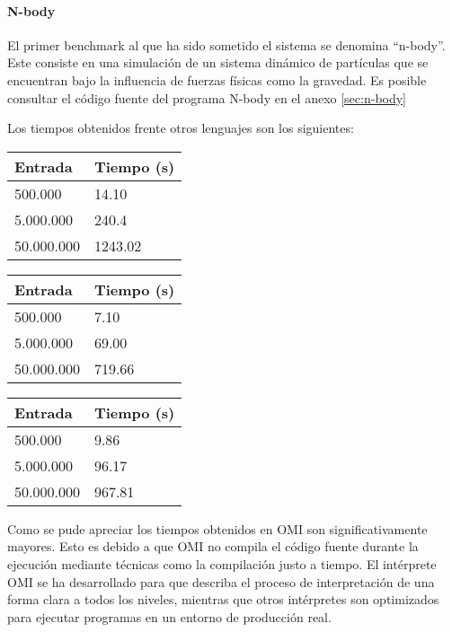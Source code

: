 \paragraph{N-body}

El primer benchmark al que ha sido sometido el sistema se denomina ``n-body''. Este consiste en una simulación de un sistema dinámico de
partículas que se encuentran bajo la influencia de fuerzas físicas como la gravedad. Es posible consultar el código fuente del programa N-body en el anexo \ref{sec:n-body}

Los tiempos obtenidos frente otros lenguajes son los siguientes: 

\begin{multicols}{2}
 \begin{center}
   \begin{tabular}{|l|l|} \hline 
   \bf{Entrada} & \bf{Tiempo (s)} \\ \hline 
   500.000 & 14.10 \\ \hline 
   5.000.000 &  240.4 \\ \hline
   50.000.000 & 1243.02 \\ \hline 
   \end{tabular}
   \end{center}
\columnbreak
   \begin{center}
   \begin{tabular}{|l|l|} \hline 
   \bf{Entrada} & \bf{Tiempo (s)} \\ \hline 
   500.000 & 7.10 \\ \hline 
   5.000.000 & 69.00	 \\ \hline
   50.000.000 & 719.66 \\ \hline 
   \end{tabular}
   \end{center}
\end{multicols}
 \begin{center}
\begin{tabular}{|l|l|} \hline 
\bf{Entrada} & \bf{Tiempo (s)} \\ \hline 
500.000 & 9.86	 \\ \hline 
5.000.000 & 96.17	 \\ \hline
50.000.000 & 967.81 \\ \hline 
\end{tabular}
\end{center}

Como se pude apreciar los tiempos obtenidos en OMI son significativamente mayores. Esto es debido a que OMI no compila el código fuente durante la ejecución mediante técnicas como la 
compilación justo a tiempo. El intérprete OMI  se ha desarrollado para que describa el proceso de interpretación de una forma clara a todos los niveles, mientras que otros intérpretes son optimizados para ejecutar programas en 
un entorno de producción real.

